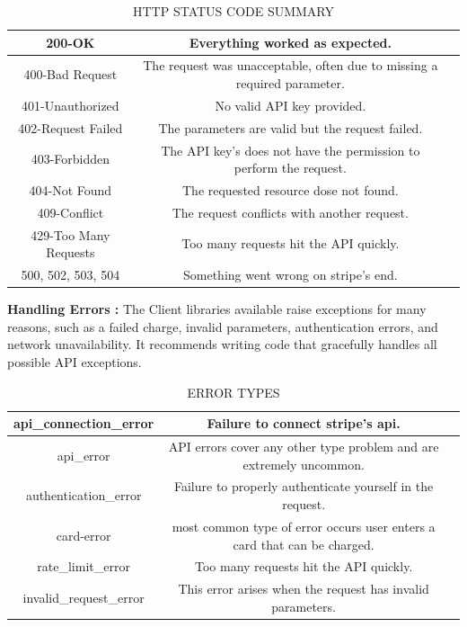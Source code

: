 \documentclass[12pt,a4paper]{report}
\begin{document}
\begin{table}
  \begin{center}
    \caption{ HTTP STATUS CODE SUMMARY }
    \begin{tabular}{ |c|c|c| } 
    \hline
    200-OK & Everything worked as expected.  \\
    \hline
    400-Bad Request & The request was unacceptable, often due to missing a required parameter. \\
    \hline
    401-Unauthorized & No valid API key provided. \\
    \hline
    402-Request Failed & The parameters are valid but the request failed. \\
    \hline
    403-Forbidden & The API key's does not have the permission to perform the request. \\
    \hline
    404-Not Found & The requested resource dose not found. \\
    \hline
    409-Conflict & The request conflicts with another request.\\
    \hline
    429-Too Many Requests & Too many requests hit the API quickly. \\
    \hline
    500, 502, 503, 504 & Something went wrong on stripe's end. \\
    \hline
    \end{tabular}
    \end{center}
  \end{table}

\textbf{Handling Errors :}
The Client libraries available raise exceptions for many reasons, such as a failed charge, invalid parameters, authentication errors, and network unavailability. It recommends writing code that gracefully handles all possible API exceptions.

\begin{table}
  \begin{center}
    \caption{ ERROR TYPES }
    \begin{tabular}{ |c|c|c| } 
    \hline
    api\_connection\_error & Failure to connect stripe's api.  \\
    \hline
    api\_error & API errors cover any other type problem and are extremely uncommon. \\
    \hline
    authentication\_error & Failure to properly authenticate yourself in the request. \\
    \hline
    card-error & most common type of error occurs user enters a card that can be charged. \\
    \hline
    rate\_limit\_error & Too many requests hit the API quickly. \\
    \hline
    invalid\_request\_error & This error arises when the request has invalid parameters. \\
    \hline
    \end{tabular}
    \end{center}
  \end{table}
\end{document}
